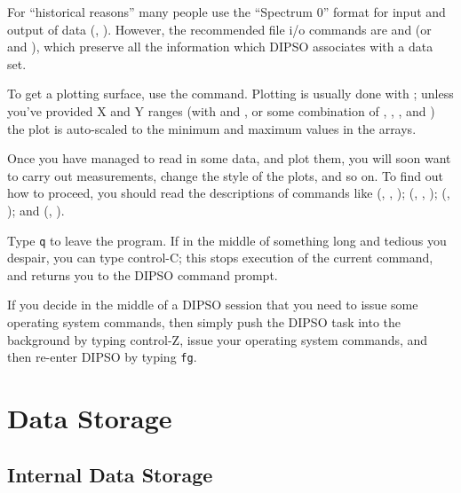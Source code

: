 \documentclass[twoside,11pt,noabs,nolof]{starlink}
\begin{document}
For ``historical reasons'' many people use the ``Spectrum 0'' format
for input and output of data (,  ).  However, the
recommended file i/o commands are   and   (or
  and ),  which preserve all the information which
DIPSO associates with a data set.

To get a plotting surface, use the   command. Plotting is
usually done with ;  unless you've provided X and Y ranges
(with   and ,  or some combination of ,
,  ,  and )  the plot is auto-scaled to the
minimum and maximum values in the arrays.

Once you have managed to read in some data, and plot them, you will
soon want to carry out measurements, change the style of the plots,
and so on. To find out how to proceed, you should read the
descriptions of commands like (,  ,  );
(,  ,  );  (,  );
and (,  ).

Type {\texttt{q}}  to leave the program. If in the middle of something long and
tedious you despair, you can type control-C; this stops execution of the current
command, and returns you to the DIPSO command prompt.

If you decide in the middle of a DIPSO session that you need to issue some
operating system commands, then simply push the DIPSO task into the background
by typing control-Z,
issue your operating system commands, and then re-enter DIPSO by typing {\texttt{fg}}.

\section {Data Storage}

\subsection{Internal Data Storage}
\end{document}
